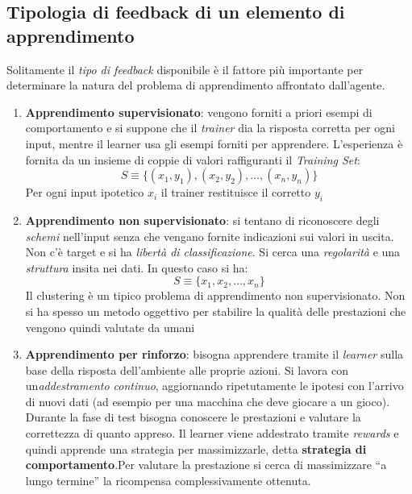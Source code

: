 \subsection{Tipologia di feedback di un elemento di apprendimento}
Solitamente il \textit{tipo di feedback} disponibile è il fattore più importante per determinare la natura del problema di apprendimento affrontato dall'agente.
\begin{enumerate}
  \item \textbf{Apprendimento supervisionato}: vengono forniti a priori
  esempi di comportamento e si suppone che il \textit{trainer} dia la risposta
  corretta per ogni input, mentre il learner usa gli esempi forniti per
  apprendere. L'esperienza è fornita da un insieme di coppie di valori raffiguranti il \textit{Training Set}:
  \[S\equiv\{(x_1, y_1),(x_2, y_2),\ldots,(x_n, y_n)\}\]
  Per ogni input ipotetico $x_i$ il trainer restituisce il corretto
  $y_i$
  \item \textbf{Apprendimento non supervisionato}: si tentano di riconoscere degli
  \textit{schemi} nell'input senza che vengano fornite indicazioni sui valori in uscita. Non c'è
  target e si ha \textit{libertà di classificazione}. Si cerca una
  \textit{regolarità} e una \textit{struttura} insita nei dati. In questo caso
  si ha: 
  \[S\equiv\{x_1, x_2,\ldots, x_n\}\]
  Il clustering è un tipico problema di apprendimento non supervisionato. Non si
  ha spesso un metodo oggettivo per stabilire la qualità delle prestazioni che vengono quindi
  valutate da umani
  \item \textbf{Apprendimento per rinforzo}: bisogna apprendere tramite il
  \textit{learner} sulla base della risposta dell’ambiente alle proprie azioni. Si lavora con
  un\textit{addestramento continuo}, aggiornando ripetutamente le ipotesi con l'arrivo di
  nuovi dati (ad esempio per una macchina che deve giocare a un gioco). Durante la
  fase di test bisogna conoscere le prestazioni e valutare la correttezza di
  quanto appreso. Il learner viene addestrato tramite \textit{rewards} e quindi
  apprende una strategia per massimizzarle, detta
  \textbf{strategia di comportamento}.Per valutare la prestazione si cerca di
  massimizzare ``a lungo termine'' la ricompensa complessivamente ottenuta.
\end{enumerate}
